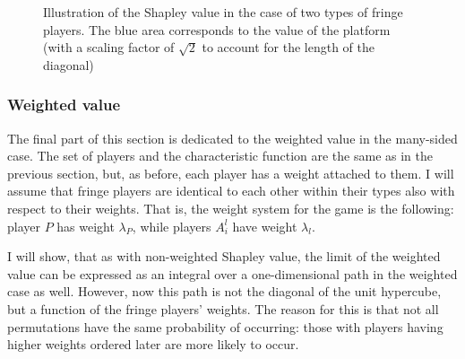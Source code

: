 \documentclass[a4paper]{article}
\begin{document}
\begin{figure}
    \centering
    \caption{Illustration of the Shapley value in the case of two types of fringe players. The blue area corresponds to the value of the platform (with a scaling factor of $\sqrt{2}$ to account for the length of the diagonal)}
    \label{fig:many_sided_shapley}
\end{figure}


\subsubsection{Weighted value}

The final part of this section is dedicated to the weighted value in the many-sided case.
The set of players and the characteristic function are the same as in the previous section, but, as before, each player has a weight attached to them.
I will assume that fringe players are identical to each other within their types also with respect to their weights.
That is, the weight system for the game is the following: player $P$ has weight $\lambda_P$, while players $A^l_i$ have weight $\lambda_l$.

I will show, that as with non-weighted Shapley value, the limit of the weighted value can be expressed as an integral over a one-dimensional path in the weighted case as well.
However, now this path is not the diagonal of the unit hypercube, but a function of the fringe players' weights.
The reason for this is that not all permutations have the same probability of occurring: those with players having higher weights ordered later are more likely to occur.
\end{document}
